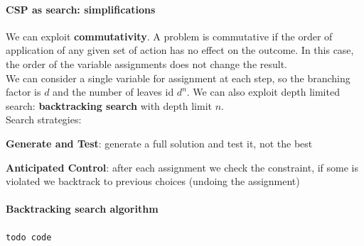 \documentclass[10pt]{report}
\begin{document}
\paragraph{CSP as search: simplifications} We can exploit \textbf{commutativity}. A problem is commutative if the order of application of any given set of action has no effect on the outcome. In this case, the order of the variable assignments does not change the result.\\
We can consider a single variable for assignment at each step, so the branching factor is $d$ and the number of leaves id $d^n$. We can also exploit depth limited search: \textbf{backtracking search} with depth limit $n$.\\
Search strategies:
\begin{list}{}{}
	\item \textbf{Generate and Test}: generate a full solution and test it, not the best
	\item \textbf{Anticipated Control}: after each assignment we check the constraint, if some is violated we backtrack to previous choices (undoing the assignment)
\end{list}
\paragraph{Backtracking search algorithm} \texttt{todo code}  %
\end{document}
